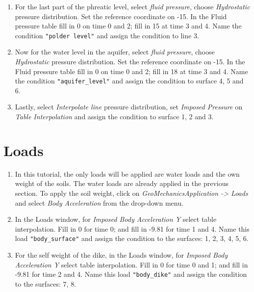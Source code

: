 \begin{enumerate}[resume]
	\item For the last part of the phreatic level, select \textit{fluid pressure}, choose \textit{Hydrostatic} pressure distribution. Set the reference coordinate on -15. In the Fluid pressure table fill in 0 on time 0 and 2; fill in 15 at time 3 and 4. Name the condition \verb|"polder level"| and assign the condition to line 3.
	
	\item Now for the water level in the aquifer, select \textit{fluid pressure}, choose \textit{Hydrostatic} pressure distribution. Set the reference coordinate on -15. In the Fluid pressure table fill in 0 on time 0 and 2; fill in 18 at time 3 and 4. Name the condition \verb|"aquifer_level"| and assign the condition to surface  4, 5 and 6.
	
	\item Lastly, select \textit{Interpolate line} pressure distribution, set \textit{Imposed Pressure} on \textit{Table Interpolation} and assign the condition to surface 1, 2 and 3.  
	
\end{enumerate}
\section{Loads}
\begin{enumerate}[resume]
	\item In this tutorial, the only loads will be applied are water loads and the own weight of the soils. The water loads are already applied in the previous section. To apply the soil weight, click on \textit{GeoMechanicsApplication -> Loads} and select  \textit{Body Acceleration} from the drop-down menu.
	
	\item In the Loads window, for \textit{Imposed Body Acceleration Y} select table interpolation. Fill in 0 for time 0; and fill in -9.81 for time 1 and 4. Name this load \verb|"body_surface"| and assign the condition to the surfaces: 1, 2, 3, 4, 5, 6. 
	
	\item For the self weight of the dike, in the Loads window, for \textit{Imposed Body Acceleration Y} select table interpolation. Fill in 0 for time 0 and 1; and fill in -9.81 for time 2 and 4. Name this load \verb|"body_dike"| and assign the condition to the surfaces: 7, 8.
		
\end{enumerate}

